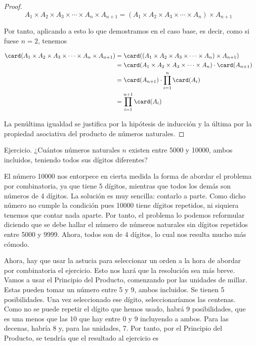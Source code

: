 \begin{proof}
  $$ A_1 \times A_2 \times A_3 \times \cdots \times A_n \times A_{n+1} =
  (A_1 \times A_2 \times A_3 \times \cdots \times A_n) \times A_{n+1} $$

  Por tanto, aplicando a esto lo que demostramos en el caso base, es decir,
  como si fuese $n = 2$, tenemos

  \begin{alignat*}{2}
    \card(A_1 \times A_2 \times A_3 \times \cdots \times A_n \times A_{n+1})
      &= \card( (A_1 \times A_2 \times A_3 \times \cdots \times A_n) \times
        A_{n+1}) \\
      &= \card(A_1 \times A_2 \times A_3 \times \cdots \times A_n) \cdot
        \card(A_{n+1}) \\
      &= \card(A_{n+1}) \cdot \prod_{i=1}^n \card(A_i) \\
      &= \prod_{i=1}^{n+1} \card(A_i)
  \end{alignat*}

  \noindent La penúltima igualdad se justifica por la hipótesis de inducción
  y la última por la propiedad asociativa del producto de números naturales.
\end{proof}

Ejercicio. ¿Cuántos números naturales $n$ existen entre 5000 y 10000, ambos
incluidos, teniendo todos sus dígitos diferentes?

El número 10000 nos entorpece en cierta medida la forma de abordar el
problema por combinatoria, ya que tiene 5 dígitos, mientras que todos los
demás son números de 4 dígitos. La solución es muy sencilla: contarlo a
parte. Como dicho número no cumple la condición pues 10000 tiene dígitos
repetidos, ni siquiera tenemos que contar nada aparte. Por tanto, el
problema lo podemos reformular diciendo que se debe hallar el número de
números naturales sin dígitos repetidos entre 5000 y 9999. Ahora, todos son
de 4 dígitos, lo cual nos resulta mucho más cómodo.

Ahora, hay que usar la astucia para seleccionar un orden a la hora de
abordar por combinatoria el ejercicio. Esto nos hará que la resolución sea
más breve. Vamos a usar el Principio del Producto, comenzando por las
unidades de millar. Estas pueden tomar un número entre 5 y 9, ambos
incluidos. Se tienen 5 posibilidades. Una vez seleccionado ese dígito,
seleccionaríamos las centenas. Como no se puede repetir el dígito que hemos
usado, habrá 9 posibilidades, que es una menos que las 10 que hay entre 0 y
9 incluyendo a ambos. Para las decenas, habría 8 y, para las unidades, 7.
Por tanto, por el Principio del Producto, se tendría que el resultado al
ejercicio es

